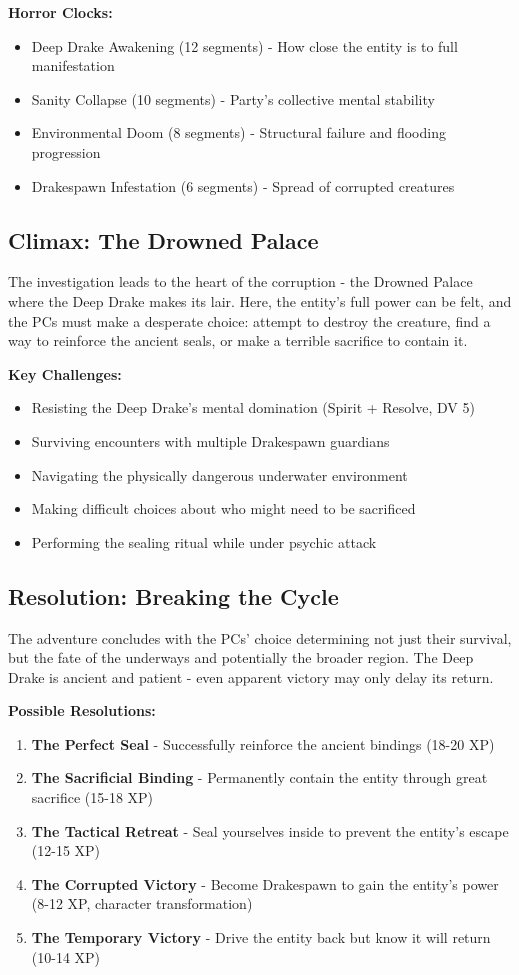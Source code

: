 \documentclass[11pt]{article}
\begin{document}
\textbf{Horror Clocks:}
\begin{itemize}
\item Deep Drake Awakening (12 segments) - How close the entity is to full manifestation
\item Sanity Collapse (10 segments) - Party's collective mental stability
\item Environmental Doom (8 segments) - Structural failure and flooding progression
\item Drakespawn Infestation (6 segments) - Spread of corrupted creatures
\end{itemize}

\subsection{Climax: The Drowned Palace}

The investigation leads to the heart of the corruption - the Drowned Palace where the Deep Drake makes its lair. Here, the entity's full power can be felt, and the PCs must make a desperate choice: attempt to destroy the creature, find a way to reinforce the ancient seals, or make a terrible sacrifice to contain it.

\textbf{Key Challenges:}
\begin{itemize}
\item Resisting the Deep Drake's mental domination (Spirit + Resolve, DV 5)
\item Surviving encounters with multiple Drakespawn guardians
\item Navigating the physically dangerous underwater environment
\item Making difficult choices about who might need to be sacrificed
\item Performing the sealing ritual while under psychic attack
\end{itemize}

\subsection{Resolution: Breaking the Cycle}

The adventure concludes with the PCs' choice determining not just their survival, but the fate of the underways and potentially the broader region. The Deep Drake is ancient and patient - even apparent victory may only delay its return.

\textbf{Possible Resolutions:}
\begin{enumerate}
\item \textbf{The Perfect Seal} - Successfully reinforce the ancient bindings (18-20 XP)
\item \textbf{The Sacrificial Binding} - Permanently contain the entity through great sacrifice (15-18 XP)
\item \textbf{The Tactical Retreat} - Seal yourselves inside to prevent the entity's escape (12-15 XP)
\item \textbf{The Corrupted Victory} - Become Drakespawn to gain the entity's power (8-12 XP, character transformation)
\item \textbf{The Temporary Victory} - Drive the entity back but know it will return (10-14 XP)
\end{enumerate}
\end{document}
